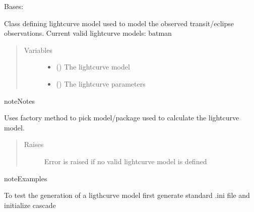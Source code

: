 \documentclass[a4paper,10pt,english]{sphinxmanual}
\begin{document}
\begin{fulllineitems}
\label{\detokenize{cascade.exoplanet_tools:cascade.exoplanet_tools.exoplanet_tools.lightcuve}}
Bases: 

Class defining lightcurve model used to model the observed
transit/eclipse observations.
Current valid lightcurve models: batman
\begin{quote}\begin{description}
\item[{Variables}] \leavevmode\begin{itemize}
\item {} 
 () \textendash{} The lightcurve model

\item {} 
 () \textendash{} The lightcurve parameters

\end{itemize}

\end{description}\end{quote}

\begin{sphinxadmonition}{note}{Notes}

Uses factory method to pick model/package used to calculate
the lightcurve model.
\end{sphinxadmonition}
\begin{quote}\begin{description}
\item[{Raises}] \leavevmode
{} \textendash{} Error is raised if no valid lightcurve model is defined

\end{description}\end{quote}

\begin{sphinxadmonition}{note}{Examples}

To test  the generation of a ligthcurve model
first generate standard .ini file and initialize cascade


\end{sphinxadmonition}
\end{fulllineitems}
\end{document}
